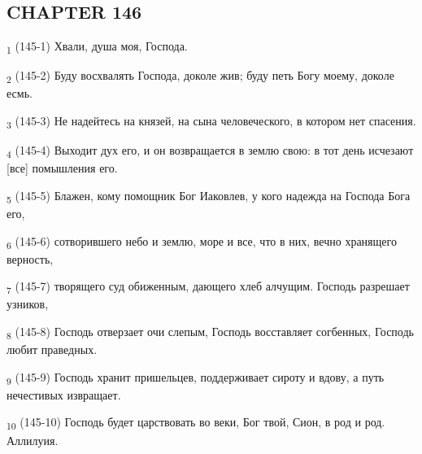 \subsection{CHAPTER 146}
\begin{tcolorbox}
\textsubscript{1} (145-1) Хвали, душа моя, Господа.
\end{tcolorbox}
\begin{tcolorbox}
\textsubscript{2} (145-2) Буду восхвалять Господа, доколе жив; буду петь Богу моему, доколе есмь.
\end{tcolorbox}
\begin{tcolorbox}
\textsubscript{3} (145-3) Не надейтесь на князей, на сына человеческого, в котором нет спасения.
\end{tcolorbox}
\begin{tcolorbox}
\textsubscript{4} (145-4) Выходит дух его, и он возвращается в землю свою: в тот день исчезают [все] помышления его.
\end{tcolorbox}
\begin{tcolorbox}
\textsubscript{5} (145-5) Блажен, кому помощник Бог Иаковлев, у кого надежда на Господа Бога его,
\end{tcolorbox}
\begin{tcolorbox}
\textsubscript{6} (145-6) сотворившего небо и землю, море и все, что в них, вечно хранящего верность,
\end{tcolorbox}
\begin{tcolorbox}
\textsubscript{7} (145-7) творящего суд обиженным, дающего хлеб алчущим. Господь разрешает узников,
\end{tcolorbox}
\begin{tcolorbox}
\textsubscript{8} (145-8) Господь отверзает очи слепым, Господь восставляет согбенных, Господь любит праведных.
\end{tcolorbox}
\begin{tcolorbox}
\textsubscript{9} (145-9) Господь хранит пришельцев, поддерживает сироту и вдову, а путь нечестивых извращает.
\end{tcolorbox}
\begin{tcolorbox}
\textsubscript{10} (145-10) Господь будет царствовать во веки, Бог твой, Сион, в род и род. Аллилуия.
\end{tcolorbox}
